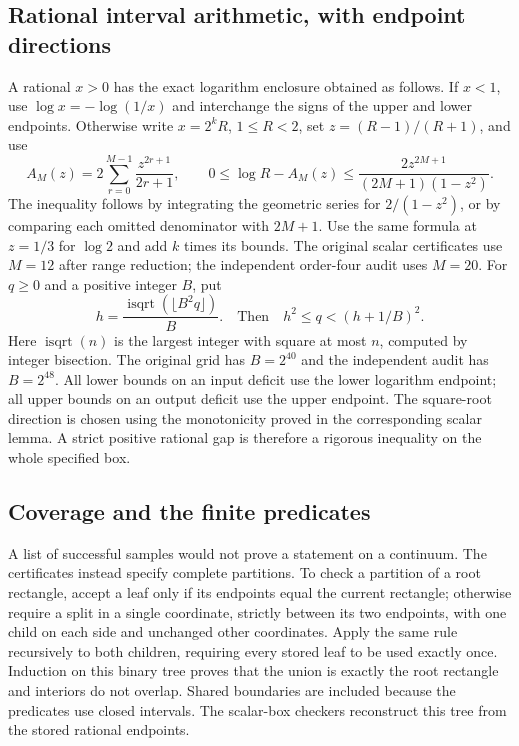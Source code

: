 \documentclass[11pt,a4paper]{article}
\begin{document}
\subsection{Rational interval arithmetic, with endpoint directions}
A rational $x>0$ has the exact logarithm enclosure obtained as follows.
If $x<1$, use $\log x=-\log(1/x)$ and interchange the signs of the
upper and lower endpoints. Otherwise write $x=2^kR$, $1\le R<2$,
set $z=(R-1)/(R+1)$, and use
\[
 A_M(z)=2\sum_{r=0}^{M-1}\frac{z^{2r+1}}{2r+1},\qquad
 0\le\log R-A_M(z)\le
 \frac{2z^{2M+1}}{(2M+1)(1-z^2)}.
\]
The inequality follows by integrating the geometric series for
$2/(1-z^2)$, or by comparing each omitted denominator with $2M+1$.
Use the same formula at $z=1/3$ for $\log2$ and add $k$ times its
bounds. The original scalar certificates use $M=12$ after range
reduction; the independent order-four audit uses $M=20$.
For $q\ge0$ and a positive integer $B$, put
\[
 h=\frac{\operatorname{isqrt}(\lfloor B^2q\rfloor)}B.
 \quad\text{Then}\quad h^2\le q<(h+1/B)^2.
\]
Here $\operatorname{isqrt}(n)$ is the largest integer with square at
most $n$, computed by integer bisection. The original grid has
$B=2^{40}$ and the independent audit has $B=2^{48}$.
All lower bounds on an input deficit use the lower logarithm endpoint;
all upper bounds on an output deficit use the upper endpoint. The
square-root direction is chosen using the monotonicity proved in the
corresponding scalar lemma. A strict positive rational gap is therefore
a rigorous inequality on the whole specified box.

\subsection{Coverage and the finite predicates}
A list of successful samples would not prove a statement on a continuum.
The certificates instead specify complete partitions. To check a
partition of a root rectangle, accept a leaf only if its endpoints equal
the current rectangle; otherwise require a split in a single coordinate,
strictly between its two endpoints, with one child on each side and
unchanged other coordinates. Apply the same rule recursively to both
children, requiring every stored leaf to be used exactly once.
Induction on this binary tree proves that the union is exactly the root
rectangle and interiors do not overlap. Shared boundaries are included
because the predicates use closed intervals. The scalar-box checkers
reconstruct this tree from the stored rational endpoints.
\end{document}
